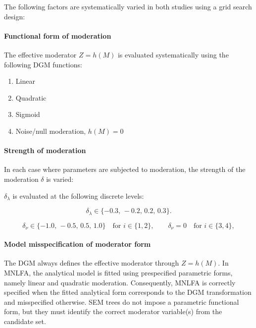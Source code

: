 \documentclass[
  man,
  floatsintext]{apa7}
\providecommand{\tightlist}{%
  \setlength{\itemsep}{0pt}\setlength{\parskip}{0pt}}
\begin{document}
The following factors are systematically varied in both studies using a
grid search design:

\paragraph{Functional form of
moderation}\label{functional-form-of-moderation}

The effective moderator \(Z = h(M)\) is evaluated systematically using
the following DGM functions:

\begin{enumerate}
\def\labelenumi{\arabic{enumi}.}
\tightlist
\item
  Linear\\
\item
  Quadratic\\
\item
  Sigmoid\\
\item
  Noise/null moderation, \(h(M)=0\)
\end{enumerate}

\paragraph{Strength of moderation}\label{strength-of-moderation}

In each case where parameters are subjected to moderation, the strength
of the moderation \(\delta\) is varied:

\(\delta_{\lambda}\) is evaluated at the following discrete levels:

\[
\delta_{\lambda} \in \{-0.3,\,-0.2,\,0.2,\,0.3\}.
\]

\[
\delta_{\nu} \in \{-1.0,\,-0.5,\,0.5,\,1.0\} \quad \text{for } i \in \{1,2\},
    \qquad
    \delta_{\nu} = 0 \quad \text{for } i \in \{3,4\},
\]

\paragraph{Model misspecification of moderator
form}\label{model-misspecification-of-moderator-form}

The DGM always defines the effective moderator through \(Z=h(M)\). In
MNLFA, the analytical model is fitted using prespecified parametric
forms, namely linear and quadratic moderation. Consequently, MNLFA is
correctly specified when the fitted analytical form corresponds to the
DGM transformation and misspecified otherwise. SEM trees do not impose a
parametric functional form, but they must identify the correct moderator
variable(s) from the candidate set.
\end{document}
